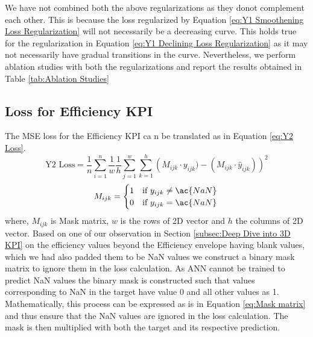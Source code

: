 \documentclass{report} %
\begin{document}
We have not combined both the above regularizations as they donot complement each other. This is because the loss regularized by Equation 
\ref{eq:Y1 Smoothening Loss Regularization} will not necessarily be a decreasing curve.
This holds true for the regularization in Equation \ref{eq:Y1 Declining Loss Regularization} as it may not necessarily have gradual transitions in the curve.
Nevertheless, we perform ablation studies with both the regularizations and report the results obtained in Table \ref{tab:Ablation Studies}

\subsection{Loss for Efficiency \ac{KPI}}\label{sec:Loss for 3D KPI}

The \ac{MSE} loss for the Efficiency \ac{KPI} ca n be translated as in Equation \ref{eq:Y2 Loss}.
\begin{equation}
\text{Y2 Loss} = \frac{1}{n} \sum_{i=1}^{n} \frac{1}{w} \frac{1}{h} \sum_{j=1}^{w} \sum_{k=1}^{h} \left( M_{ijk} \cdot y_{ijk}) - (M_{ijk} \cdot \hat{y}_{ijk})\right)^2
\label{eq:Y2 Loss}
\end{equation}
\begin{equation}
    M_{ijk} = \begin{cases}
        1 & \text{if } y_{ijk} \neq \ac{NaN} \\
        0 & \text{if } y_{ijk} = \ac{NaN} 
        \end{cases} \\
\label{eq:Mask matrix}
\end{equation}
where, \(M_{ijk}\) is Mask matrix, \(w\) is the rows of 2\ac{D} vector and \(h\) the columns of 2\ac{D} vector.
Based on one of our observation in Section \ref{subsec:Deep Dive into 3D KPI} on the efficiency values beyond the Efficiency envelope having blank values, 
which we had also padded them to be \ac{NaN} values we construct a binary mask matrix to ignore them in the loss calculation.
As \ac{ANN} cannot be trained to predict \ac{NaN} values the binary mask is constructed such that values corresponding to \ac{NaN} in the target have value 0 and all other values as 1.
Mathematically, this process can be expressed as is in Equation \ref{eq:Mask matrix} and thus ensure that the \ac{NaN} values are ignored in the loss calculation. 
The mask is then multiplied with both the target and its respective prediction. 
\end{document}

